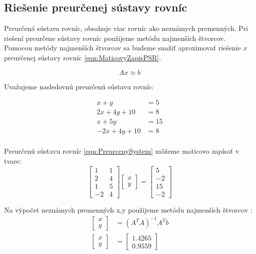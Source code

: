 \documentclass[../main.tex]{subfiles}
\begin{document}
	
\subsection{Riešenie preurčenej sústavy rovníc}

Preurčená sústava rovníc, obsahuje viac rovníc ako neznámych premenných. Pri riešení preurčene sústavy rovníc použijeme metódu najmenších štvorcov. Pomocou metódy najmenších štvorcov sa budeme snažiť aproximovať riešenie $x$ preurčenej sústavy rovníc \ref{eqn:MaticovyZapisPSR}.

\begin{equation}
	Ax \approx b
	\label{eqn:MaticovyZapisPSR}
\end{equation}

Uvažujeme nasledovnú preurčenú sústavu rovníc:

\begin{equation}
	\begin{split}
	 x+y  & = 5 \\
	 2x+4y+10 & = 8 \\
	 x+5y & = 15 \\
	 -2x+4y+10 & = 8 \\
	\end{split}
	\label{eqn:PreurcenySystem}
\end{equation}

Preurčenú sústavu rovníc \ref{eqn:PreurcenySystem} môžeme maticovo zapísať v tvare:
\begin{equation}
\begin{bmatrix} 1 & 1\\ 2 & 4 \\1 &5 \\-2& 4\end{bmatrix}\begin{bmatrix}x \\y \end{bmatrix} = \begin{bmatrix} 5 \\-2\\15\\-2 \end{bmatrix}
 \label{eqn:MaticovyZapisPiklad}
\end{equation}

Na výpočet neznámych premenných x,y použijeme metódu najmenších štvorcov :
\begin{equation}
	\begin{split}
	\begin{bmatrix}x \\y \end{bmatrix} &=  (A^TA)^{-1}A^Tb\\
	\begin{bmatrix}x \\y \end{bmatrix} &=  \begin{bmatrix} 1.4265 \\0.9559\end{bmatrix}
	\end{split}
	\label{eqn:MNS}
\end{equation}

		
\end{document}
